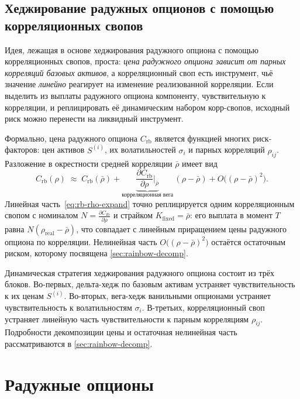 \subsection{Хеджирование радужных опционов с помощью корреляционных
           свопов}
\label{sec:corr-hedge-rainbow}

Идея, лежащая в основе хеджирования радужного опциона с помощью
корреляционных свопов, проста: \emph{цена радужного опциона зависит от
парных корреляций базовых активов}, а корреляционный своп есть
инструмент, чьё значение \emph{линейно} реагирует на изменение
реализованной корреляции. Если выделить из выплаты радужного опциона
компоненту, чувствительную к корреляции, и реплицировать её
динамическим набором корр-свопов, исходный риск можно перенести на
ликвидный инструмент.

Формально, цена радужного опциона $C_{\text{rb}}$ является функцией
многих риск-факторов: цен активов $S^{(i)}$, их волатильностей
$\sigma_i$ и парных корреляций $\rho_{ij}$. Разложение в окрестности
средней корреляции $\bar\rho$ имеет вид
\begin{equation}
\label{eq:rb-rho-expand}
  C_{\text{rb}}(\rho) \;\approx\;
  C_{\text{rb}}(\bar\rho)
   + \underbrace{\frac{\partial C_{\text{rb}}}{\partial \rho}
                 \bigg|_{\bar\rho}}_{\text{корреляционная вега}}\,
                 (\rho - \bar\rho)
   + O\bigl((\rho-\bar\rho)^{2}\bigr).
\end{equation}
Линейная часть~\eqref{eq:rb-rho-expand} точно реплицируется одним
корреляционным свопом с номиналом
$N = \tfrac{\partial C_{\text{rb}}}{\partial \rho}$ и страйком
$K_{\text{fixed}} = \bar\rho$: его выплата в момент $T$ равна
$N(\rho_{\text{real}} - \bar\rho)$, что совпадает с линейным
приращением цены радужного опциона по корреляции. Нелинейная часть
$O\bigl((\rho-\bar\rho)^{2}\bigr)$ остаётся остаточным риском,
которому посвящена \cref{sec:rainbow-decomp}.

Динамическая стратегия хеджирования радужного опциона состоит из трёх
блоков. Во-первых, дельта-хедж по базовым активам устраняет
чувствительность к их ценам $S^{(i)}$. Во-вторых, вега-хедж ванильными
опционами устраняет чувствительность к волатильностям $\sigma_i$.
В-третьих, корреляционный своп устраняет линейную часть
чувствительности к парным корреляциям $\rho_{ij}$. Подробности
декомпозиции цены и оста\-точная нелинейная часть рассматриваются в
\cref{sec:rainbow-decomp}.

\section{Радужные опционы}
\label{sec:rainbow-section}

